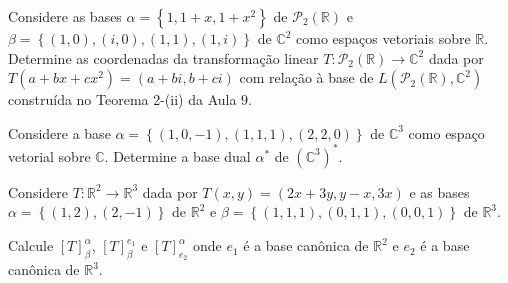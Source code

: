 \begin{questions}
  \question\label{exercício:2.13}

  Considere as bases $\alpha=\left\{1,1+x,1+x^{2}\right\}$ de
  $\mathcal{P}_{2}\left(\mathbb{R}\right)$ e
  \begin{math}
    \beta=
    \left\{
    \left(1,0\right),
    \left(i,0\right),
    \left(1,1\right),
    \left(1,i\right)
    \right\}
  \end{math}
  de $\mathbb{C}^{2}$ como espaços vetoriais sobre $\mathbb{R}$.
  Determine as coordenadas da transformação linear
  $T\colon\mathcal{P}_{2}\left(\mathbb{R}\right)\to\mathbb{C}^{2}$ dada
  por $T\left(a+bx+cx^{2}\right)=\left(a+bi,b+ci\right)$ com relação
  à base de
  \begin{math}
    L
    \left(
    \mathcal{P}_{2}\left(\mathbb{R}\right),
    \mathbb{C}^{2}
    \right)
  \end{math}
  construída no Teorema 2-(ii) da Aula $9$.

  \begin{solutionordottedlines}
  \end{solutionordottedlines}

  \question\label{exercício:2.14}

  Considere a base
  \begin{math}
    \alpha=
    \left\{
    \left(1,0,-1\right),
    \left(1,1,1\right),
    \left(2,2,0\right)
    \right\}
  \end{math}
  de $\mathbb{C}^{3}$ como espaço vetorial sobre $\mathbb{C}$.
  Determine a base dual $\alpha^{\ast}$ de
  ${\left(\mathbb{C}^{3}\right)}^{\ast}$.

  \begin{solutionordottedlines}
  \end{solutionordottedlines}

  \question\label{exercício:2.15}

  Considere $T\colon\mathbb{R}^{2}\to\mathbb{R}^{3}$ dada por
  $T\left(x,y\right)=\left(2x+3y,y-x,3x\right)$ e as bases
  $\alpha=\left\{\left(1,2\right),\left(2,-1\right)\right\}$ de
  $\mathbb{R}^{2}$ e
  \begin{math}
    \beta=
    \left\{
    \left(1,1,1\right),
    \left(0,1,1\right),
    \left(0,0,1\right)
    \right\}
  \end{math}
  de $\mathbb{R}^{3}$.

  Calcule ${\left[T\right]}_{\beta}^{\alpha}$,
  ${\left[T\right]}_{\beta}^{e_{1}}$ e
  ${\left[T\right]}_{e_{2}}^{\alpha}$ onde $e_{1}$ é a base canônica
  de $\mathbb{R}^{2}$ e $e_{2}$ é a base canônica de
  $\mathbb{R}^{3}$.


\end{questions}
